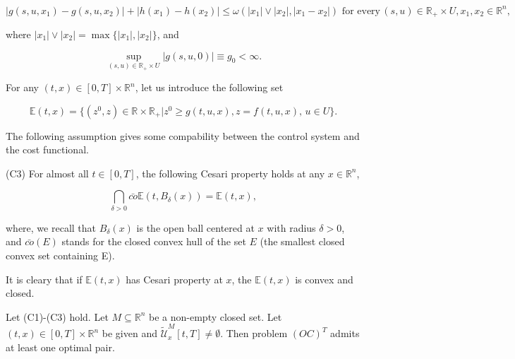 $$|g(s,u,x_1)-g(s,u,x_2)|+|h(x_1)-h(x_2)|\leq \omega(|x_1|\vee |x_2|,|x_1-x_2|)\,\,\mbox{for every}\, (s,u)\in \mathbb{R}_{+}\times U,x_1,x_2\in \mathbb{R}^n,$$

where $|x_1|\vee |x_2|=\max\{|x_1|,|x_2|\}$, and

$$\sup_{(s,u)\in \mathbb{R}_{+}\times U}|g(s,u,0)|\equiv g_0<\infty.$$


For any $(t,x)\in [0,T]\times\mathbb{R}^n$, let us introduce the following set

$$\mathbb{E}(t,x)=\{(z^0,z)\in \mathbb{R}\times \mathbb{R}_{+}|z^0\geq g(t,u,x),z=f(t,u,x),\, u\in U\}.$$

The following assumption gives some compability between the control system and the cost functional.

(C3) For almost all $t\in [0,T]$, the following Cesari property holds at any $x\in \mathbb{R}^n$,

$$\bigcap_{\delta>0}\bar{co}\mathbb{E}(t,B_{\delta}(x))=\mathbb{E}(t,x),$$

where, we recall that $B_{\delta}(x)$ is the open ball centered at $x$ with radius $\delta>0$, and $\bar{co}(E)$ stands for the closed convex hull of the set $E$ (the smallest closed convex set containing E).

It is cleary that if $\mathbb{E}(t,x)$ has Cesari property at $x$, the $\mathbb{E}(t,x)$ is convex and closed.

\begin{theorem}\label{ExistsTheo}
	Let (C1)-(C3) hold. Let $M\subseteq \mathbb{R}^n$ be a non-empty closed set. Let $(t,x)\in [0,T]\times\mathbb{R}^n$ be given and $\tilde{\mathcal{U}}^M_x[t,T]\neq \emptyset$. Then problem $(OC)^T$ admits at least one optimal pair.
\end{theorem}

